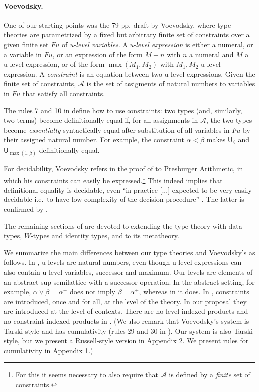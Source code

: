 \documentclass[a4paper,UKenglish,cleveref, autoref, thm-restate]{lipics-v2021}
\newcommand{\UU}{\mathsf{U}}
\newcommand{\AFu}{\mathcal{A}}
\newcommand{\Fu}{\mathit{Fu}}
\begin{document}
\paragraph{Voevodsky.} One of our starting points was the 79 pp.\ draft \cite{VV} by Voevodsky, where type theories are parametrized by a fixed but arbitrary finite set of constraints over a given finite
set $\Fu$ of \emph{u-level variables}. A \emph{u-level expression} \cite[Def. 2.0.2]{VV} is either a numeral,
or a variable in $\Fu$, or an expression of the form $M+n$ with $n$
a numeral and $M$ a u-level expression, or of the form $\max(M_1,M_2)$
with $M_1,M_2$ u-level expression. A \emph{constraint} is an equation
between two u-level expressions. Given the finite set of constraints,
$\AFu$ is the set of assigments of natural numbers to variables
in $\Fu$ that satisfy all constraints.

The rules 7 and 10 in \cite[Section 3.4]{VV} define how to use constraints:
two types (and, similarly, two terms) become definitionally equal
if, for all assignments in $\AFu$, the two types become \emph{essentially}
syntactically equal after substitution of all variables in $\Fu$ by
their assigned natural number. For example, the constraint
$\alpha < \beta$ makes $\UU_\beta$ and $\UU_{\max(1,\beta)}$
definitionally equal.

For decidability, Voevodsky refers in the proof of
\cite[Lemma 2.0.4, proof]{VV} to Presburger Arithmetic,
in which his constraints can easily be expressed.\footnote{%
For this it seems necessary to also require that $\AFu$
is defined by a \emph{finite} set of constraints.}%
This indeed implies that definitional equality is decidable, even
``in practice [...] expected to be very easily decidable i.e.\
to have low complexity of the decision procedure''
\cite[p.\ 5, l.\ -13]{VV}.
The latter is confirmed by \cite{bezem-coquand:lattices}.

The remaining sections of \cite{VV} are devoted to extending the
type theory with data types, $W$-types and identity types,
and to its metatheory.

We summarize the main differences between our type theories
and Voevodsky's as follows.
%
In \cite{VV}, u-levels are natural numbers, even though u-level
expressions can also contain u-level variables, successor and maximum.
Our levels are elements of an abstract sup-semilattice with a successor
operation. In the abstract setting, for example,
$\alpha\vee\beta=\alpha^+$ does not imply $\beta=\alpha^+$,
whereas in \cite{VV} it does.
%
In \cite{VV}, constraints are introduced, once and for all,
at the level of the theory. In our proposal they are introduced
at the level of contexts.
There are no level-indexed products and no constraint-indexed products in \cite{VV}.
(We also remark that Voevodsky's system is Tarski-style and has cumulativity (rules 29 and 30 in \cite[Section 3.4]{VV}). Our system is also Tarski-style, but we present a Russell-style version in Appendix 2. We present rules for cumulativity in Appendix 1.)
\end{document}
